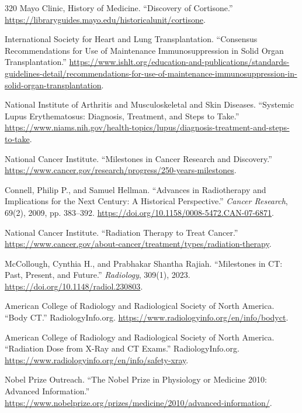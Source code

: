\documentclass[12pt,oneside]{book}
\begin{document}
\begin{thebibliography}{320}
Mayo Clinic, History of Medicine. ``Discovery of Cortisone.''
\url{https://libraryguides.mayo.edu/historicalunit/cortisone}.

International Society for Heart and Lung Transplantation. ``Consensus
Recommendations for Use of Maintenance Immunosuppression in Solid Organ
Transplantation.''
\url{https://www.ishlt.org/education-and-publications/standards-guidelines-detail/recommendations-for-use-of-maintenance-immunosuppression-in-solid-organ-transplantation}.

National Institute of Arthritis and Musculoskeletal and Skin Diseases.
``Systemic Lupus Erythematosus: Diagnosis, Treatment, and Steps to Take.''
\url{https://www.niams.nih.gov/health-topics/lupus/diagnosis-treatment-and-steps-to-take}.

National Cancer Institute. ``Milestones in Cancer Research and Discovery.''
\url{https://www.cancer.gov/research/progress/250-years-milestones}.

Connell, Philip P., and Samuel Hellman. ``Advances in Radiotherapy and
Implications for the Next Century: A Historical Perspective.'' \emph{Cancer
Research}, 69(2), 2009, pp. 383--392.
\url{https://doi.org/10.1158/0008-5472.CAN-07-6871}.

National Cancer Institute. ``Radiation Therapy to Treat Cancer.''
\url{https://www.cancer.gov/about-cancer/treatment/types/radiation-therapy}.

McCollough, Cynthia H., and Prabhakar Shantha Rajiah. ``Milestones in CT:
Past, Present, and Future.'' \emph{Radiology}, 309(1), 2023.
\url{https://doi.org/10.1148/radiol.230803}.

American College of Radiology and Radiological Society of North America.
``Body CT.'' RadiologyInfo.org.
\url{https://www.radiologyinfo.org/en/info/bodyct}.

American College of Radiology and Radiological Society of North America.
``Radiation Dose from X-Ray and CT Exams.'' RadiologyInfo.org.
\url{https://www.radiologyinfo.org/en/info/safety-xray}.

Nobel Prize Outreach. ``The Nobel Prize in Physiology or Medicine 2010:
Advanced Information.''
\url{https://www.nobelprize.org/prizes/medicine/2010/advanced-information/}.


\end{thebibliography}
\end{document}
